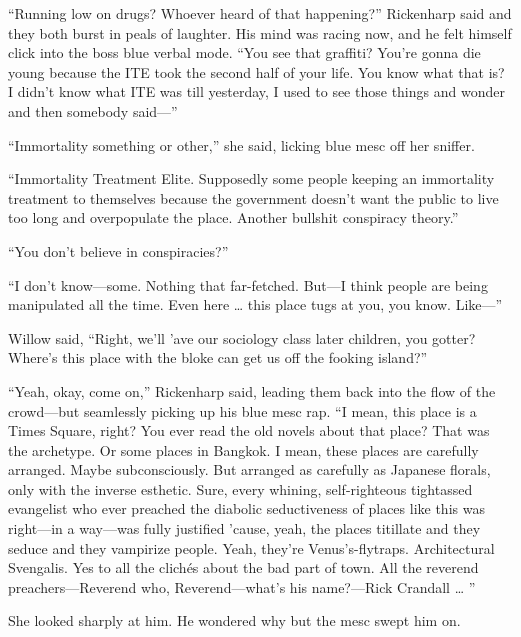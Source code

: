 “Running low on drugs? Whoever heard of that happening?” Rickenharp said and they both burst in peals of laughter. His mind was racing now, and he felt himself click into the boss blue verbal mode. “You see that graffiti? You’re gonna die young because the ITE took the second half of your life. You know what that is? I didn’t know what ITE was till yesterday, I used to see those things and wonder and then somebody said—”

“Immortality something or other,” she said, licking blue mesc off her sniffer.

“Immortality Treatment Elite. Supposedly some people keeping an immortality treatment to themselves because the government doesn’t want the public to live too long and overpopulate the place. Another bullshit conspiracy theory.”

“You don’t believe in conspiracies?”

“I don’t know—some. Nothing that far-fetched. But—I think people are being manipulated all the time. Even here … this place tugs at you, you know. Like—”

Willow said, “Right, we’ll ’ave our sociology class later children, you gotter? Where’s this place with the bloke can get us off the fooking island?”

“Yeah, okay, come on,” Rickenharp said, leading them back into the flow of the crowd—but seamlessly picking up his blue mesc rap. “I mean, this place is a Times Square, right? You ever read the old novels about that place? That was the archetype. Or some places in Bangkok. I mean, these places are carefully arranged. Maybe subconsciously. But arranged as carefully as Japanese florals, only with the inverse esthetic. Sure, every whining, self-righteous tightassed evangelist who ever preached the diabolic seductiveness of places like this was right—in a way—was fully justified ’cause, yeah, the places titillate and they seduce and they vampirize people. Yeah, they’re Venus’s-flytraps. Architectural Svengalis. Yes to all the clichés about the bad part of town. All the reverend preachers—Reverend who, Reverend—what’s his name?—Rick Crandall … ”

She looked sharply at him. He wondered why but the mesc swept him on.

